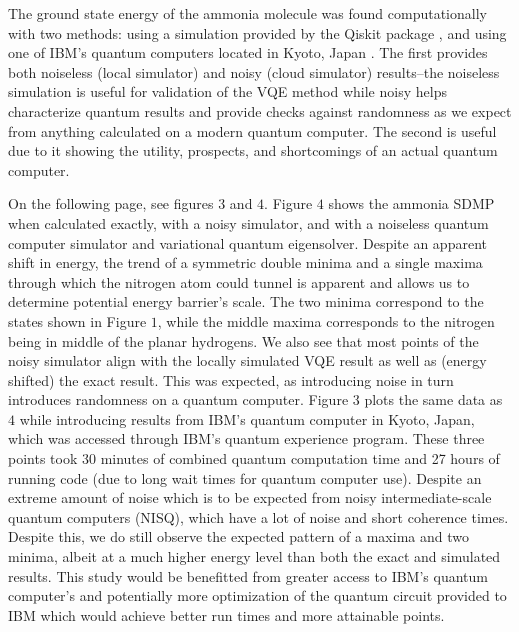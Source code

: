 \documentclass[10pt,twocolumn,letterpaper]{article}
\begin{document}
The ground state energy of the ammonia molecule was found computationally with two methods: using a simulation provided by the Qiskit package \cite{Qiskit}, and using one of IBM's quantum computers located in Kyoto, Japan \cite{ibm}. The first provides both noiseless (local simulator) and noisy (cloud simulator) results--the noiseless simulation is useful for validation of the VQE method while noisy helps characterize quantum results and provide checks against randomness as we expect from anything calculated on a modern quantum computer. The second is useful due to it showing the utility, prospects, and shortcomings of an actual quantum computer. 

On the following page, see figures $3$ and $4$. Figure $4$ shows the ammonia SDMP when calculated exactly, with a noisy simulator, and with a noiseless quantum computer simulator and variational quantum eigensolver. Despite an apparent shift in energy, the trend of a symmetric double minima and a single maxima through which the nitrogen atom could tunnel is apparent and allows us to determine potential energy barrier's scale. The two minima correspond to the states shown in Figure $1$, while the middle maxima corresponds to the nitrogen being in middle of the planar hydrogens. We also see that most points of the noisy simulator align with the locally simulated VQE result as well as (energy shifted) the exact result. This was expected, as introducing noise in turn introduces randomness on a quantum computer. Figure $3$ plots the same data as $4$ while introducing results from IBM's quantum computer in Kyoto, Japan, which was accessed through IBM's quantum experience program. These three points took 30 minutes of combined quantum computation time and 27 hours of running code (due to long wait times for quantum computer use). Despite an extreme amount of noise which is to be expected from noisy intermediate-scale quantum computers (NISQ), which have a lot of noise and short coherence times. Despite this, we do still observe the expected pattern of a maxima and two minima, albeit at a much higher energy level than both the exact and simulated results. This study would be benefitted from greater access to IBM's quantum computer's and potentially more optimization of the quantum circuit provided to IBM which would achieve better run times and more attainable points.
\end{document}

